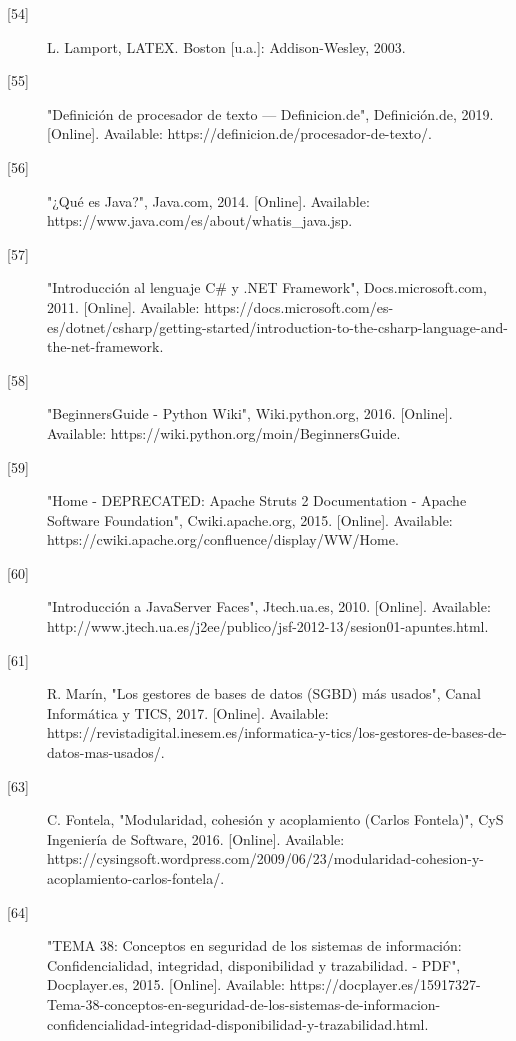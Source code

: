 \begin{description}
		\item[\hypertarget{b54}{[54]}]L. Lamport, LATEX. Boston [u.a.]: Addison-Wesley, 2003.
		
		\item[\hypertarget{b55}{[55]}] "Definición de procesador de texto — Definicion.de", Definición.de, 2019. [Online]. Available: https://definicion.de/procesador-de-texto/. 
		
		\item[\hypertarget{b56}{[56]}] "¿Qué es Java?", Java.com, 2014. [Online]. Available: https://www.java.com/es/about/whatis\_java.jsp. 
		
		\item[\hypertarget{b57}{[57]}] "Introducción al lenguaje C\# y .NET Framework", Docs.microsoft.com, 2011. [Online]. Available: https://docs.microsoft.com/es-es/dotnet/csharp/getting-started/introduction-to-the-csharp-language-and-the-net-framework.
		
		\item[\hypertarget{b58}{[58]}] "BeginnersGuide - Python Wiki", Wiki.python.org, 2016. [Online]. Available: https://wiki.python.org/moin/BeginnersGuide. 
		
		\item[\hypertarget{b59}{[59]}] "Home - DEPRECATED: Apache Struts 2 Documentation - Apache Software Foundation", Cwiki.apache.org, 2015. [Online]. Available: https://cwiki.apache.org/confluence/display/WW/Home. 
		
		\item[\hypertarget{b60}{[60]}] "Introducción a JavaServer Faces", Jtech.ua.es, 2010. [Online]. Available: http://www.jtech.ua.es/j2ee/publico/jsf-2012-13/sesion01-apuntes.html. 
		
		\item[\hypertarget{b61}{[61]}] R. Marín, "Los gestores de bases de datos (SGBD) más usados", Canal Informática y TICS, 2017. [Online]. Available: https://revistadigital.inesem.es/informatica-y-tics/los-gestores-de-bases-de-datos-mas-usados/.
		
		\item[\hypertarget{b63}{[63]}] C. Fontela, "Modularidad, cohesión y acoplamiento (Carlos Fontela)", CyS Ingeniería de Software, 2016. [Online]. Available: https://cysingsoft.wordpress.com/2009/06/23/modularidad-cohesion-y-acoplamiento-carlos-fontela/.
		
		\item[\hypertarget{b64}{[64]}] "TEMA 38: Conceptos en seguridad de los sistemas de información: Confidencialidad, integridad, disponibilidad y trazabilidad. - PDF", Docplayer.es, 2015. [Online]. Available: https://docplayer.es/15917327-Tema-38-conceptos-en-seguridad-de-los-sistemas-de-informacion-confidencialidad-integridad-disponibilidad-y-trazabilidad.html. 
		

\end{description}
